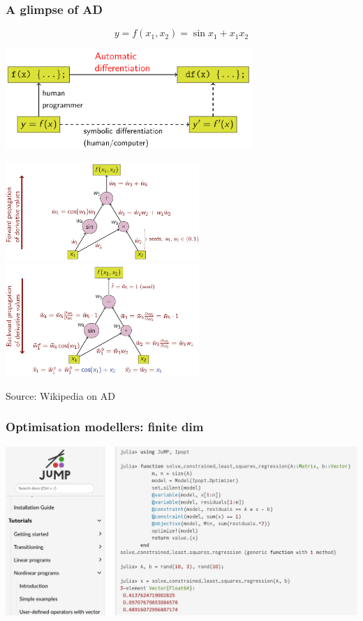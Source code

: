 \documentclass[9pt]{beamer}
\begin{document}
\begin{frame}
\frametitle{\bf A glimpse of AD}

$$ y = f(x_1, x_2) = \sin x_1 + x_1 x_2 $$

\centering \includegraphics[width=0.7\textwidth]{ad}

\hspace*{-0.7cm} \includegraphics[width=0.55\textwidth]{forward} \includegraphics[width=0.55\textwidth]{reverse}

\begin{flushright}
Source: Wikipedia on AD
\end{flushright}

\end{frame}

\begin{frame}
\frametitle{\bf Optimisation modellers: finite dim}

\centering \includegraphics[width=1.05\textwidth]{jump}

\end{frame}
\end{document}
